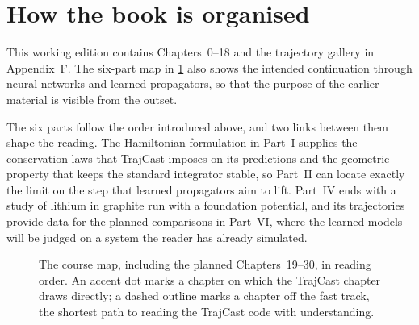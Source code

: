 \section{How the book is organised}
\label{sec:or-map}

This working edition contains Chapters~0--18 and the trajectory gallery
in Appendix~F. The six-part map in \cref{fig:or-map} also shows the intended
continuation through neural networks and learned propagators, so that the
purpose of the earlier material is visible from the outset.

The six parts follow the order introduced above, and two links between
them shape the reading. The Hamiltonian formulation in Part~I supplies the
conservation laws that TrajCast imposes on its predictions and the geometric
property that keeps the standard integrator stable, so Part~II can locate
exactly the limit on the step that learned propagators aim to lift. Part~IV
ends with a study of lithium in graphite run with a foundation potential,
and its trajectories provide data for the planned comparisons in Part~VI,
where the learned models will be judged on a system the reader has already
simulated.

\begin{figure}[!hb]
\centering

\caption{The course map, including the planned Chapters~19--30, in reading
order. An accent dot marks a
chapter on which the TrajCast chapter draws directly; a dashed outline marks
a chapter off the fast track, the shortest path to reading the TrajCast code
with understanding.}
\label{fig:or-map}
\end{figure}
